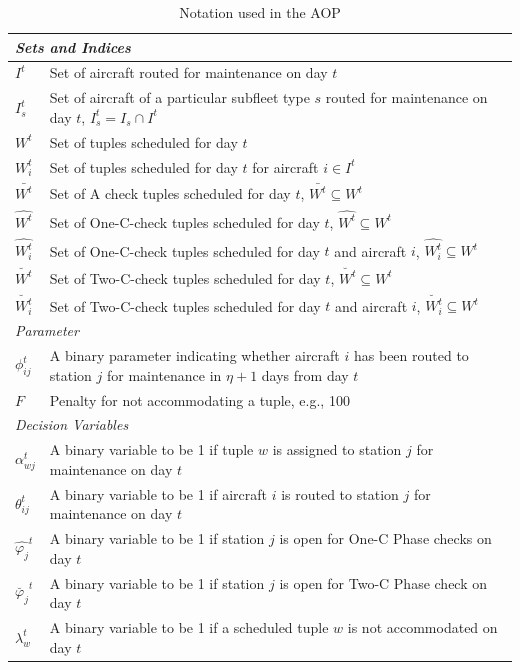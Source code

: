 



\begin{table}[ht]
\centering
\caption{Notation used in the AOP}
\label{tab:notation_tabDecomp2}
\begin{tabular}{lp{16cm}} 
\toprule
\multicolumn{2}{l}{\textit{Sets and Indices}} \\ 
\hline
$I^t$ & Set of aircraft routed for maintenance on day $t$ \\
$I_s^t$ & Set of aircraft of a particular subfleet type $s$ routed for maintenance on day $t$, $I_s^t = I_s \cap I^t$ \\
$W^t$ & Set of tuples scheduled for day $t$ \\
$W_i^t$ & Set of tuples scheduled for day $t$ for aircraft $i \in I^t$ \\
$\bar{W^t}$ & Set of A check tuples scheduled for day $t$, $\bar{W^t} \subseteq W^t$ \\
$\hat{W^t}$ & Set of One-C-check tuples scheduled for day $t$, $\hat{W^t} \subseteq W^t$ \\
$\hat{W_i^t}$ & Set of One-C-check tuples scheduled for day $t$ and aircraft $i$, $\hat{W_i^t} \subseteq W^t $ \\
$\breve{W^t}$ & Set of Two-C-check tuples scheduled for day $t$, $\breve{W^t} \subseteq W^t$ \\
$\breve{W_i^t}$ & Set of Two-C-check tuples scheduled for day $t$ and aircraft $i$, $\breve{W_i^t} \subseteq W^t$ \\ 
\hline
\multicolumn{2}{l}{\textit{Parameter}}  \\
\hline
$\phi_{ij}^t$ & A binary parameter indicating whether aircraft $i$ has been routed to station $j$ for maintenance in $\eta + 1$ days from day $t$ \\
$F$ & Penalty for not accommodating a tuple, e.g., 100  \\
\hline
\multicolumn{2}{l}{\textit{Decision Variables}} \\ 
\hline
$\alpha_{wj}^t$ & A binary variable to be 1 if tuple $w$ is assigned to station $j$ for maintenance on day $t$ \\
$\theta_{ij}^t$ & A binary variable to be 1 if aircraft $i$ is routed to station $j$ for maintenance on day $t$ \\
$\hat{\varphi_j}^t$ & A binary variable to be 1 if station $j$ is open for One-C Phase checks on day $t$ \\
$\breve{\varphi_j}^t$ & A binary variable to be 1 if station $j$ is open for Two-C Phase check on day $t$  \\
$\lambda_{w}^t$ & A binary variable to be 1  if a scheduled tuple $w$ is not accommodated on day $t$ \\ 
\hline
\end{tabular}
\end{table}




